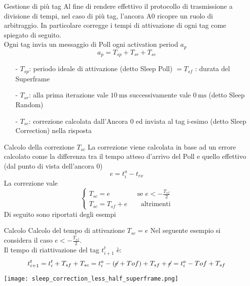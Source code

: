 \begin{frame}{Gestione di più tag}
  Al fine di rendere effettivo il protocollo di trasmissione a divisione di tempi, nel caso di più tag,
  l'ancora A0 ricopre un ruolo di arbitraggio. In particolare corregge i tempi di attivazione
  di ogni tag come spiegato di seguito.\\
  Ogni tag invia un messaggio di Poll ogni \alert{activation period} $a_p$
  \[
  a_p = T_{sp} + T_{sr} + T_{sc}
  \]
  \begin{itemize}
  \item[-] $T_{sp}$: periodo ideale di attivazione (detto Sleep Poll) $ = T_{sf}$ : durata del Superframe 
  \item[-] $T_{sr}$: alla prima iterazione vale $\SI{10}{\milli\second}$ successivamente vale  $\SI{0}{\milli\second}$
    (detto Sleep Random)
  \item[-] $T_{sc}$: correzione calcolata dall'\alert{Ancora 0} ed inviata al \alert{tag i-esimo} (detto Sleep Correction)
    nella risposta
  \end{itemize}
\end{frame}

\begin{frame}{Calcolo della correzione $T_{sc}$}
  La correzione viene calcolata in base ad un errore calcolato come la differenza tra il tempo atteso
  d'arrivo del Poll e quello effettivo (dal punto di vista dell'ancora 0)
  \[
  e = t_{i}^{a} - t_{rx}
  \]
  La correzione vale
  \[
  \begin{cases}
    T_{sc} = e \quad \quad \quad \quad \text{se } e < -\frac{T_{sf}}{2}\\
    T_{sc} = T_{sf} + e \quad \quad \text{altrimenti}
  \end{cases}
  \]
  Di seguito sono riportati degli esempi
\end{frame}

\begin{frame}{Calcolo Calcolo del tempo di attivazione $T_{sc} = e$}
  Nel seguente esempio si considera il caso $e < -\frac{T_{sf}}{2}$.\\
  Il tempo di riattivazione del tag $t_{i+1}^{t}$ è:
  \[
  t_{i+1}^{t} = t_{i}^{t} + T_{sf} + T_{sc} = t_i^a - (\cancel{e} + Tof) + T_{sf} + \cancel{e} = t_i^a - Tof + T_{sf} 
  \]
  \begin{center}
    \texttt{[image: sleep\_correction\_less\_half\_superframe.png]}
  \end{center}
\end{frame}

